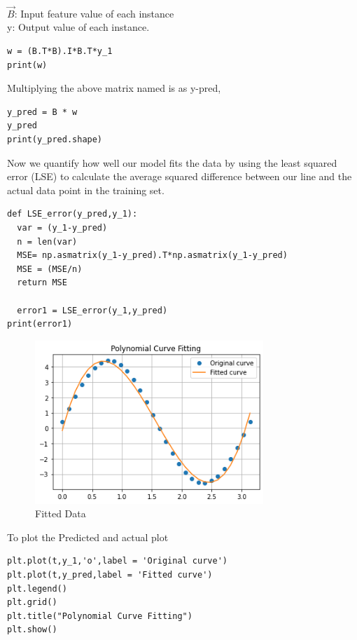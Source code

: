 \documentclass[journal,12pt,twocolumn]{IEEEtran}
\begin{document}
\\
$\vec{B}$: Input feature value of each instance
\\
y: Output value of each instance.
\begin{lstlisting}
w = (B.T*B).I*B.T*y_1
print(w)
\end{lstlisting} 
%
Multiplying the above matrix  named is as y-pred,
\begin{lstlisting}
y_pred = B * w
y_pred
print(y_pred.shape)
\end{lstlisting}
Now we quantify how well our model fits the data by using the least squared error (LSE) to calculate the average squared difference between our line and the actual data point in the training set.
\begin{lstlisting}
def LSE_error(y_pred,y_1):
  var = (y_1-y_pred)
  n = len(var)
  MSE= np.asmatrix(y_1-y_pred).T*np.asmatrix(y_1-y_pred)
  MSE = (MSE/n)
  return MSE
  
  error1 = LSE_error(y_1,y_pred)
print(error1)
\end{lstlisting}
\begin{figure}[!h]
\begin{center}
\includegraphics[width=3.4in]{a2.png}
\end{center}
\caption{Fitted Data}
\label{fig:2}
\end{figure}
To plot the Predicted and actual plot 
\begin{lstlisting}
plt.plot(t,y_1,'o',label = 'Original curve')
plt.plot(t,y_pred,label = 'Fitted curve')
plt.legend()
plt.grid()
plt.title("Polynomial Curve Fitting")
plt.show()
\end{lstlisting}
\end{document}
